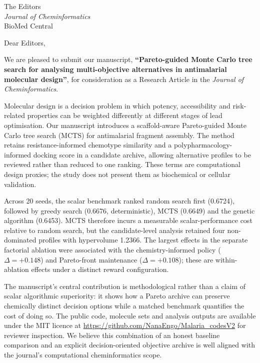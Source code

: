 \documentclass[11pt,a4paper]{letter}
\begin{document}
\begin{letter}{%
  The Editors \\
  \textit{Journal of Cheminformatics} \\
  BioMed Central
}

\opening{Dear Editors,}

We are pleased to submit our manuscript, \textbf{``Pareto-guided Monte Carlo tree search for analysing multi-objective alternatives in antimalarial molecular design''}, for consideration as a Research Article in the \textit{Journal of Cheminformatics}.

Molecular design is a decision problem in which potency, accessibility and risk-related properties can be weighted differently at different stages of lead optimisation. Our manuscript introduces a scaffold-aware Pareto-guided Monte Carlo tree search (MCTS) for antimalarial fragment assembly. The method retains resistance-informed chemotype similarity and a polypharmacology-informed docking score in a candidate archive, allowing alternative profiles to be reviewed rather than reduced to one ranking. These terms are computational design proxies; the study does not present them as biochemical or cellular validation.

Across \num{20} seeds, the scalar benchmark ranked random search first (\num{0.6724}), followed by greedy search (\num{0.6676}, deterministic), MCTS (\num{0.6649}) and the genetic algorithm (\num{0.6453}). MCTS therefore incurs a measurable scalar-performance cost relative to random search, but the candidate-level analysis retained four non-dominated profiles with hypervolume \num{1.2366}. The largest effects in the separate factorial ablation were associated with the chemistry-informed policy ($\Delta=+\num{0.148}$) and Pareto-front maintenance ($\Delta=+\num{0.108}$); these are within-ablation effects under a distinct reward configuration.

The manuscript's central contribution is methodological rather than a claim of scalar algorithmic superiority: it shows how a Pareto archive can preserve chemically distinct decision options while a matched benchmark quantifies the cost of doing so. The public code, molecule sets and analysis outputs are available under the MIT licence at \url{https://github.com/NanaEngo/Malaria_codesV2} for reviewer inspection. We believe this combination of an honest baseline comparison and an explicit decision-oriented objective archive is well aligned with the journal's computational cheminformatics scope.


\end{letter}
\end{document}
